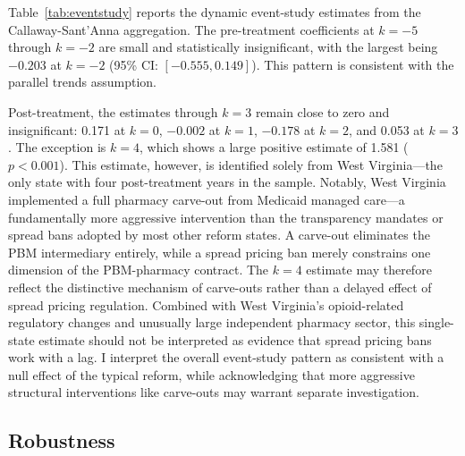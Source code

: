 \documentclass[12pt]{article}
\begin{document}
Table~\ref{tab:eventstudy} reports the dynamic event-study estimates from the Callaway-Sant'Anna aggregation. The pre-treatment coefficients at $k = -5$ through $k = -2$ are small and statistically insignificant, with the largest being $-0.203$ at $k = -2$ (95\% CI: $[-0.555, 0.149]$). This pattern is consistent with the parallel trends assumption.

Post-treatment, the estimates through $k = 3$ remain close to zero and insignificant: 0.171 at $k = 0$, $-0.002$ at $k = 1$, $-0.178$ at $k = 2$, and 0.053 at $k = 3$. The exception is $k = 4$, which shows a large positive estimate of 1.581 ($p < 0.001$). This estimate, however, is identified solely from West Virginia---the only state with four post-treatment years in the sample. Notably, West Virginia implemented a full pharmacy carve-out from Medicaid managed care---a fundamentally more aggressive intervention than the transparency mandates or spread bans adopted by most other reform states. A carve-out eliminates the PBM intermediary entirely, while a spread pricing ban merely constrains one dimension of the PBM-pharmacy contract. The $k = 4$ estimate may therefore reflect the distinctive mechanism of carve-outs rather than a delayed effect of spread pricing regulation. Combined with West Virginia's opioid-related regulatory changes and unusually large independent pharmacy sector, this single-state estimate should not be interpreted as evidence that spread pricing bans work with a lag. I interpret the overall event-study pattern as consistent with a null effect of the typical reform, while acknowledging that more aggressive structural interventions like carve-outs may warrant separate investigation.

\subsection{Robustness}
\end{document}
